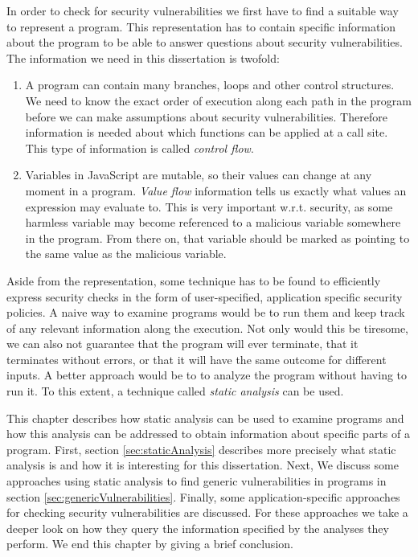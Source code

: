 In order to check for security vulnerabilities we first have to find a suitable way to represent a program. This representation has to contain specific information about the program to be able to answer questions about security vulnerabilities. The information we need in this dissertation is twofold:

\begin{enumerate}
\item A program can contain many branches, loops and other control structures. We need to know the exact order of execution along each path in the program before we can make assumptions about security vulnerabilities. Therefore information is needed about which functions can be applied at a call site. This type of information is called \textit{control flow}.
\item Variables in JavaScript are mutable, so their values can change at any moment in a program. \textit{Value flow} information tells us exactly what values an expression may evaluate to. This is very important w.r.t. security, as some harmless variable may become referenced to a malicious variable somewhere in the program. From there on, that variable should be marked as pointing to the same value as the malicious variable.
\end{enumerate}

Aside from the representation, some technique has to be found to efficiently express security checks in the form of user-specified, application specific security policies. A naive way to examine programs would be to run them and keep track of any relevant information along the execution. Not only would this be tiresome, we can also not guarantee that the program will ever terminate, that it terminates without errors, or that it will have the same outcome for different inputs. A better approach would be to to analyze the program without having to run it. To this extent, a technique called \textit{static analysis} can be used.

This chapter describes how static analysis can be used to examine programs and how this analysis can be addressed to obtain information about specific parts of a program. First, section \ref{sec:staticAnalysis} describes more precisely what static analysis is and how it is interesting for this dissertation. Next, We discuss some approaches using static analysis to find generic vulnerabilities in programs in section \ref{sec:genericVulnerabilities}. Finally, some application-specific approaches for checking security vulnerabilities are discussed. For these approaches we take a deeper look on how they query the information specified by the analyses they perform. We end this chapter by giving a brief conclusion.

